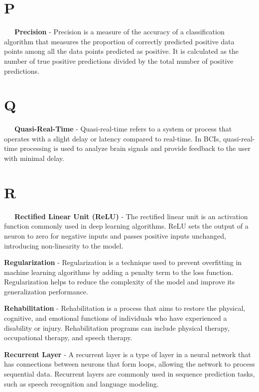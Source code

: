 \section*{P}

\-\ \-\ \-\ \textbf{Precision} - Precision is a measure of the accuracy of a classification algorithm that measures the proportion of correctly predicted positive data points among all the data points predicted as positive. It is calculated as the number of true positive predictions divided by the total number of positive predictions.

\section*{Q}

\-\ \-\ \-\ \textbf{Quasi-Real-Time} - Quasi-real-time refers to a system or process that operates with a slight delay or latency compared to real-time. In BCIs, quasi-real-time processing is used to analyze brain signals and provide feedback to the user with minimal delay.

\section*{R}

\-\ \-\ \-\ \textbf{Rectified Linear Unit (ReLU)} - The rectified linear unit is an activation function commonly used in deep learning algorithms. ReLU sets the output of a neuron to zero for negative inputs and passes positive inputs unchanged, introducing non-linearity to the model.

\textbf{Regularization} - Regularization is a technique used to prevent overfitting in machine learning algorithms by adding a penalty term to the loss function. Regularization helps to reduce the complexity of the model and improve its generalization performance.

\textbf{Rehabilitation} - Rehabilitation is a process that aims to restore the physical, cognitive, and emotional functions of individuals who have experienced a disability or injury. Rehabilitation programs can include physical therapy, occupational therapy, and speech therapy.

\textbf{Recurrent Layer} - A recurrent layer is a type of layer in a neural network that has connections between neurons that form loops, allowing the network to process sequential data. Recurrent layers are commonly used in sequence prediction tasks, such as speech recognition and language modeling.

